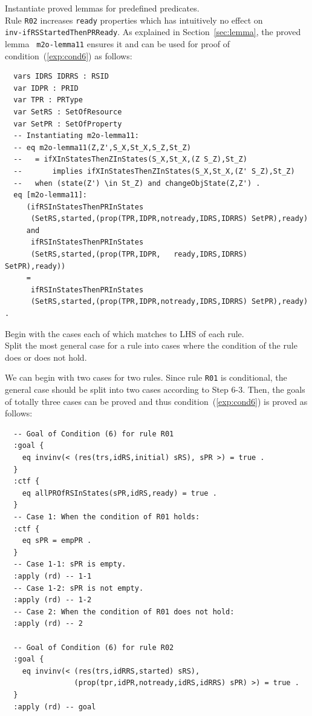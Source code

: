 \documentclass[12pt]{report}
\begin{document}
 Instantiate proved lemmas for predefined
predicates. \\ Rule {\tt R02} increases {\tt ready} properties which
has intuitively no effect on \\ {\tt inv-ifRSStartedThenPRReady}. As
explained in Section~\ref{sec:lemma}, the proved lemma {\tt
  m2o-lemma11} ensures it and can be used for proof of
condition~(\ref{exp:cond6}) as follows:
\begin{verbatim}
  vars IDRS IDRRS : RSID 
  var IDPR : PRID
  var TPR : PRType
  var SetRS : SetOfResource
  var SetPR : SetOfProperty
  -- Instantiating m2o-lemma11:
  -- eq m2o-lemma11(Z,Z',S_X,St_X,S_Z,St_Z)
  --   = ifXInStatesThenZInStates(S_X,St_X,(Z S_Z),St_Z)
  --       implies ifXInStatesThenZInStates(S_X,St_X,(Z' S_Z),St_Z) 
  --   when (state(Z') \in St_Z) and changeObjState(Z,Z') .
  eq [m2o-lemma11]:
     (ifRSInStatesThenPRInStates
      (SetRS,started,(prop(TPR,IDPR,notready,IDRS,IDRRS) SetPR),ready)
     and
      ifRSInStatesThenPRInStates
      (SetRS,started,(prop(TPR,IDPR,   ready,IDRS,IDRRS) SetPR),ready))
     = 
      ifRSInStatesThenPRInStates
      (SetRS,started,(prop(TPR,IDPR,notready,IDRS,IDRRS) SetPR),ready) .
\end{verbatim}

\vspace{0.3cm}
 Begin with the cases each of which matches to
LHS of each rule. \\ 
 Split the most general case for a rule into
cases where the condition of the rule does or does not hold. 

We can begin with two cases for two rules. Since rule {\tt R01} is
conditional, the general case should be split into two cases according
to Step 6-3. Then, the goals of totally three cases can be proved and
thus condition~(\ref{exp:cond6}) is proved as follows:
\begin{verbatim}
  -- Goal of Condition (6) for rule R01
  :goal {
    eq invinv(< (res(trs,idRS,initial) sRS), sPR >) = true .
  }
  :ctf {
    eq allPROfRSInStates(sPR,idRS,ready) = true .
  }
  -- Case 1: When the condition of R01 holds:
  :ctf {
    eq sPR = empPR .
  }
  -- Case 1-1: sPR is empty.
  :apply (rd) -- 1-1
  -- Case 1-2: sPR is not empty.
  :apply (rd) -- 1-2
  -- Case 2: When the condition of R01 does not hold:
  :apply (rd) -- 2

  -- Goal of Condition (6) for rule R02
  :goal {
    eq invinv(< (res(trs,idRRS,started) sRS),
                (prop(tpr,idPR,notready,idRS,idRRS) sPR) >) = true .
  }
  :apply (rd) -- goal
\end{verbatim}
\end{document}
